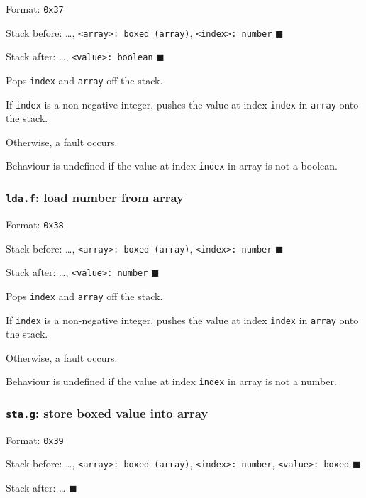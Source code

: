 Format: \texttt{0x37}

Stack before: \ldots,
\texttt{\textless{}array\textgreater{}:\ boxed\ (array)},
\texttt{\textless{}index\textgreater{}:\ number} \(\blacksquare\)

Stack after: \ldots, \texttt{\textless{}value\textgreater{}:\ boolean}
\(\blacksquare\)

Pops \texttt{index} and \texttt{array} off the stack.

If \texttt{index} is a non-negative integer, pushes the value at index
\texttt{index} in \texttt{array} onto the stack.

Otherwise, a fault occurs.

Behaviour is undefined if the value at index \texttt{index} in array is
not a boolean.

\subsubsection{\texorpdfstring{\texttt{lda.f}: load number from
array}{lda.f: load number from array}}

Format: \texttt{0x38}

Stack before: \ldots,
\texttt{\textless{}array\textgreater{}:\ boxed\ (array)},
\texttt{\textless{}index\textgreater{}:\ number} \(\blacksquare\)

Stack after: \ldots, \texttt{\textless{}value\textgreater{}:\ number}
\(\blacksquare\)

Pops \texttt{index} and \texttt{array} off the stack.

If \texttt{index} is a non-negative integer, pushes the value at index
\texttt{index} in \texttt{array} onto the stack.

Otherwise, a fault occurs.

Behaviour is undefined if the value at index \texttt{index} in array is
not a number.

\subsubsection{\texorpdfstring{\texttt{sta.g}: store boxed value into
array}{sta.g: store boxed value into array}}

Format: \texttt{0x39}

Stack before: \ldots,
\texttt{\textless{}array\textgreater{}:\ boxed\ (array)},
\texttt{\textless{}index\textgreater{}:\ number},
\texttt{\textless{}value\textgreater{}:\ boxed} \(\blacksquare\)

Stack after: \ldots{} \(\blacksquare\)

